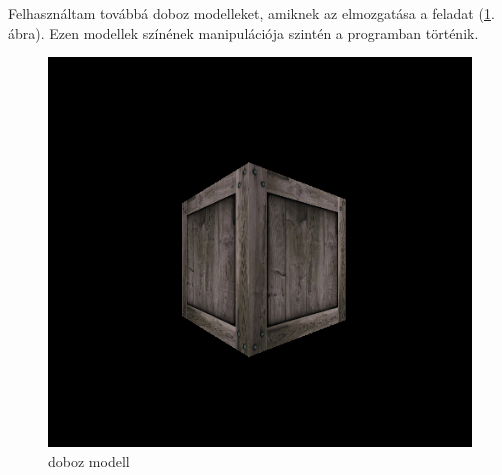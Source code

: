 Felhasználtam továbbá doboz modelleket, amiknek az elmozgatása a feladat (\ref{fig:box}. ábra). Ezen modellek színének manipulációja szintén a programban történik.

\begin{figure}[htp]
    \centering
   	\includegraphics[scale=0.5]{images/box.png}
	\caption{doboz modell}
	\label{fig:box}
\end{figure}

